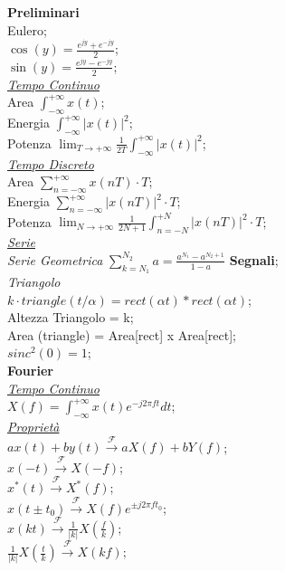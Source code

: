 \documentclass[a4paper]{article}
\begin{document}
\begin{multicols*}{3}
\textbf{Preliminari} \\
Eulero; \\
$\cos(y)=\frac{e^{jy} + e^{-jy}}{2}$; \\
$\sin(y)=\frac{e^{jy} - e^{-jy}}{2}$; \\
\underline{\textit{Tempo Continuo}} \\
Area $\int_{-\infty}^{+\infty} x(t)$; \\
Energia $\int_{-\infty}^{+\infty} |x(t)|^2$; \\
Potenza 
$\lim_{T \to +\infty}\frac{1}{2T}\int_{-\infty}^{+\infty}|x(t)|^2$; \\
\underline{\textit{Tempo Discreto}} \\
Area $\sum_{n=-\infty}^{+\infty} x(nT) \cdot T$; \\
Energia $\sum_{n=-\infty}^{+\infty}|x(nT)|^2\cdot T$; \\
Potenza
$\lim_{N \to +\infty}{\frac{1}{2N + 1}\int_{n=-N}^{+N}|x(nT)|^2\cdot T}$; \\
\underline{\textit{Serie}} \\
\textit{Serie Geometrica}
$\sum_{k=N_1}^{N_2}a=\frac{a^{N_1}-a^{N_2 + 1}}{1-a}$
\textbf{Segnali}; \\
\textit{Triangolo }\\
$k\cdot triangle(t/\alpha) = rect(\alpha t) * rect(\alpha t)$; \\
Altezza Triangolo = k; \\
Area (triangle) = Area[rect] x Area[rect]; \\ 
$sinc^2(0) = 1$;\\
\textbf{Fourier} \\
\underline{\textit{Tempo Continuo}} \\
$X(f) = \int_{-\infty}^{+\infty} x(t) e^{-j2\pi ft} dt$; \\
\underline{\textit{Proprietà}} \\
$ax(t) + by(t) \xrightarrow{\mathscr{F}} aX(f) + bY(f)$; \\
$x(-t) \xrightarrow{\mathscr{F}} X(-f)$; \\
$x^{*}(t) \xrightarrow{\mathscr{F}} X^{*}(f)$; \\
$x(t{\pm}t_0) \xrightarrow{\mathscr{F}} X(f)e^{{\pm}j2{\pi}f{t_0}}$; \\
$x(kt) \xrightarrow{\mathscr{F}} \frac{1}{|k|}X(\frac{f}{k})$; \\
$\frac{1}{|k|}X(\frac{t}{k}) \xrightarrow{\mathscr{F}} X(kf)$; \\

\end{multicols*}
\end{document}
